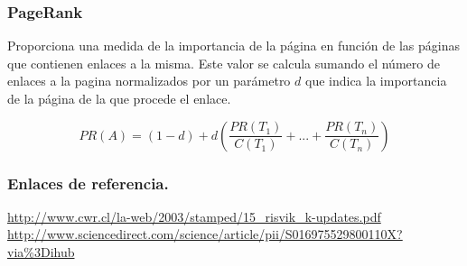 \documentclass[9pt]{beamer} %
\begin{document}
\begin{frame}
	\frametitle{PageRank}
Proporciona una medida de la importancia de la página en función de las páginas que contienen enlaces a la misma. Este valor se calcula sumando el número de enlaces a la pagina normalizados por un parámetro $d$ que indica la importancia de la página de la que procede el enlace.

\[
PR(A)=(1-d)+d(\frac{PR(T_1)}{C(T_1)}+...+\frac{PR(T_n)}{C(T_n)})
\]
\end{frame}
\begin{frame}
	\frametitle{Enlaces de referencia.}
	\begin{thebibliography}{9}
		
		\url{http://www.cwr.cl/la-web/2003/stamped/15_risvik_k-updates.pdf}
		\url{http://www.sciencedirect.com/science/article/pii/S016975529800110X?via\%3Dihub}
		
	\end{thebibliography}
\end{frame}
\end{document}

